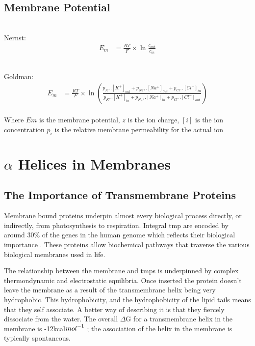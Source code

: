 \subsection{Membrane Potential}

\\
Nernst:
\\
\begin{align*}
{E}_{m} &= \frac{RT}{F}\times \ln { \frac{{c}_{out}}{{c}_{in}} }
\end{align*}

\\
Goldman:
\\
\begin{align*}
{E}_{m} &= \frac{RT}{F}\times \ln \left(\frac{p_{K^+}.[K^+]_{out} + p_{Na^+}.[Na^+]_{out} + p_{Cl^-}.[Cl^-]_{in}} {p_{K^+}.[K^+]_{in} + p_{Na^+}.[Na^+]_{in} + p_{Cl^-}.[Cl^-]_{out}}\right)
\end{align*}
\\
 Where $Em$ is the membrane potential, $z$ is the ion charge, $[i]$ is the ion concentration
 $p_i$ is the relative membrane permeability for the actual ion


\section{$\alpha$ Helices in Membranes }
\subsection{The Importance of Transmembrane Proteins}
Membrane bound proteins underpin almost every biological process directly, or indirectly, from photosynthesis to respiration. Integral \gls{tmp} are encoded by around 30\% of the genes in the human genome which reflects their biological importance \cite{Almen2009}. These proteins allow biochemical pathways that traverse the various biological membranes used in life. %



The relationship between the membrane and \gls{tmp}s is underpinned by complex thermondynamic and electrostatic equilibria. Once inserted the protein doesn't leave the membrane as a result of the transmembrane helix being very hydrophobic. This hydrophobicity, and the hydrophobicity of the lipid tails means that they self associate. A better way of describing it is that they fiercely dissociate from the water. The overall $\Delta$G for a transmembrane helix in the membrane is -12kcal${mol}^{\--1}$ \cite{Cymer2014}; the association of the helix in the membrane is typically spontaneous.

